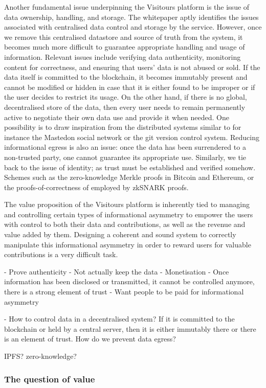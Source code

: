 \documentclass[fontsize=12pt,a4paper]{article}
\begin{document}
Another fundamental issue underpinning the Visitours platform is the issue of data ownership, handling, and storage. The whitepaper aptly identifies the issues associated with centralised data control and storage by the service. However, once we remove this centralised datastore and source of truth from the system, it becomes much more difficult to guarantee appropriate handling and usage of information. Relevant issues include verifying data authenticity, monitoring content for correctness, and ensuring that users' data is not abused or sold. If the data itself is committed to the blockchain, it becomes immutably present and cannot be modified or hidden in case that it is either found to be improper or if the user decides to restrict its usage. On the other hand, if there is no global, decentralised store of the data, then every user needs to remain permanently active to negotiate their own data use and provide it when needed. One possibility is to draw inspiration from the distributed systems similar to for instance the Mastedon social network or the git version control system. Reducing informational egress is also an issue: once the data has been surrendered to a non-trusted party, one cannot guarantee its appropriate use. Similarly, we tie back to the issue of identity; as trust must be established and verified somehow. Schemes such as the zero-knowledge Merkle proofs in Bitcoin and Ethereum, or the proofs-of-correctness of employed by zkSNARK proofs.

The value proposition of the Visitours platform is inherently tied to managing and controlling certain types of informational asymmetry to empower the users with control to both their data and contributions, as well as the revenue and value added by them. Designing a coherent and sound system to correctly manipulate this informational asymmetry in order to reward users for valuable contributions is a very difficult task.

- Prove authenticity
- Not actually keep the data
- Monetisation
- Once information has been disclosed or transmitted, it cannot be controlled anymore, there is a strong element of trust
- Want people to be paid for informational asymmetry

- How to control data in a decentralised system? If it is committed to the blockchain or held by a central server, then it is either immutably there or there is an element of trust. How do we prevent data egress? 

IPFS? zero-knowledge?


\subsubsection*{The question of value}
\end{document}
